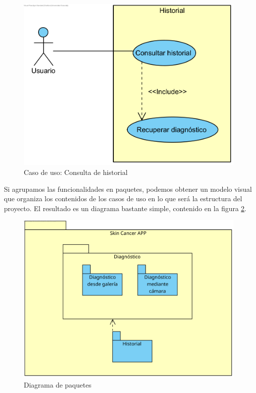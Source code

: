  
  \begin{figure}[H]
 	\centering
 	\includegraphics[scale = 1]{imagenes/Historial.png}
 	\caption{Caso de uso: Consulta de historial}
 	\label{fig:histcu}
 \end{figure}

Si agrupamos las funcionalidades en paquetes, podemos obtener un modelo visual que organiza los contenidos de los casos de uso en lo que  será la estructura del proyecto. El resultado es un diagrama bastante simple, contenido en la figura \ref{fig:paquetes}.

\begin{figure}[H]
	\centering
	\includegraphics[scale = 0.7]{imagenes/DiagramaPaquetes.png}
	\caption{Diagrama de paquetes}
	\label{fig:paquetes}
\end{figure}

